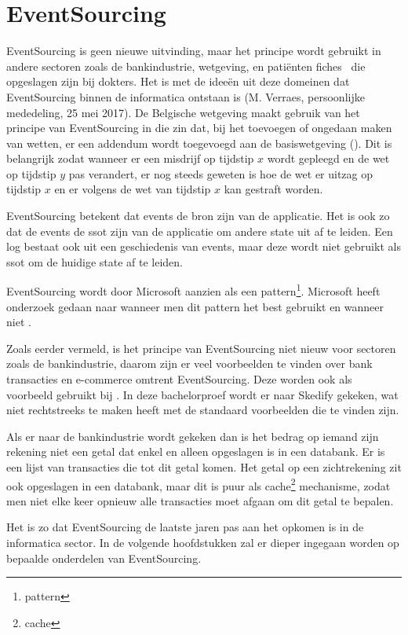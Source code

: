 
\chapter{EventSourcing}
\label{ch:eventsourcing}

EventSourcing is geen nieuwe uitvinding, maar het principe wordt gebruikt in andere sectoren zoals de bankindustrie, wetgeving, en patiënten fiches~\autocite{mann2003standards} die opgeslagen zijn bij dokters. Het is met de ideeën uit deze domeinen dat EventSourcing binnen de informatica ontstaan is (M. Verraes, persoonlijke mededeling, 25 mei 2017). De Belgische wetgeving maakt gebruik van het principe van EventSourcing in die zin dat, bij het toevoegen of ongedaan maken van wetten, er een addendum wordt toegevoegd aan de basiswetgeving (\cite{belgischewetgeving}). Dit is belangrijk zodat wanneer er een misdrijf op tijdstip $x$ wordt gepleegd en de wet op tijdstip $y$ pas verandert, er nog steeds geweten is hoe de wet er uitzag op tijdstip $x$ en er volgens de wet van tijdstip $x$ kan gestraft worden.

EventSourcing betekent dat events de bron zijn van de applicatie. Het is ook zo dat de events de \gls{ssot} zijn van de applicatie om andere \gls{state} uit af te leiden. Een log bestaat ook uit een geschiedenis van events, maar deze wordt niet gebruikt als \gls{ssot} om de huidige \gls{state} af te leiden.

EventSourcing wordt door Microsoft aanzien als een \gls{pattern}\footnote{\glsdesc{pattern}}. Microsoft heeft onderzoek gedaan naar wanneer men dit \gls{pattern} het best gebruikt en wanneer niet \autocite{Microsoft2017ES}.

Zoals eerder vermeld, is het principe van EventSourcing niet nieuw voor sectoren zoals de bankindustrie, daarom zijn er veel voorbeelden te vinden over bank transacties en e-commerce omtrent EventSourcing. Deze worden ook als voorbeeld gebruikt bij \textcite{Microsoft2017ES}. In deze bachelorproef wordt er naar Skedify gekeken, wat niet rechtstreeks te maken heeft met de standaard voorbeelden die te vinden zijn.

Als er naar de bankindustrie wordt gekeken dan is het bedrag op iemand zijn rekening niet een getal dat enkel en alleen opgeslagen is in een databank. Er is een lijst van transacties die tot dit getal komen. Het getal op een zichtrekening zit ook opgeslagen in een databank, maar dit is puur als \gls{cache}\footnote{\glsdesc{cache}} mechanisme, zodat men niet elke keer opnieuw alle transacties moet afgaan om dit getal te bepalen.

Het is zo dat EventSourcing de laatste jaren pas aan het opkomen is in de informatica sector. In de volgende hoofdstukken zal er dieper ingegaan worden op bepaalde onderdelen van EventSourcing.